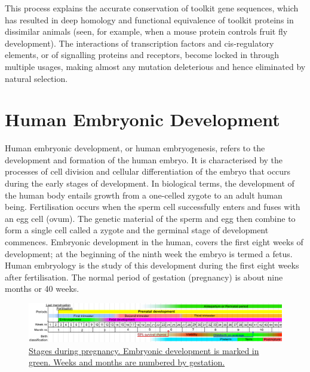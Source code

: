This process explains the accurate conservation of toolkit gene sequences, which has resulted in deep homology and functional equivalence of toolkit proteins in dissimilar animals (seen, for example, when a mouse protein controls fruit fly development). The interactions of transcription factors and cis-regulatory elements, or of signalling proteins and receptors, become locked in through multiple usages, making almost any mutation deleterious and hence eliminated by natural selection.

\hypertarget{human-embryonic-development}{%
\section{Human Embryonic Development}\label{human-embryonic-development}}

Human embryonic development, or human embryogenesis, refers to the development and formation of the human embryo. It is characterised by the processes of cell division and cellular differentiation of the embryo that occurs during the early stages of development. In biological terms, the development of the human body entails growth from a one-celled zygote to an adult human being. Fertilisation occurs when the sperm cell successfully enters and fuses with an egg cell (ovum). The genetic material of the sperm and egg then combine to form a single cell called a zygote and the germinal stage of development commences. Embryonic development in the human, covers the first eight weeks of development; at the beginning of the ninth week the embryo is termed a fetus. Human embryology is the study of this development during the first eight weeks after fertilisation. The normal period of gestation (pregnancy) is about nine months or 40 weeks.



\begin{figure}

{\centering \includegraphics[width=0.7\linewidth]{./figures/development/Prenatal_development_table} 

}

\caption{\href{https://upload.wikimedia.org/wikipedia/commons/5/57/Prenatal_development_table.svg}{Stages during pregnancy. Embryonic development is marked in green. Weeks and months are numbered by gestation.}}\label{fig:pregnancystages}
\end{figure}

